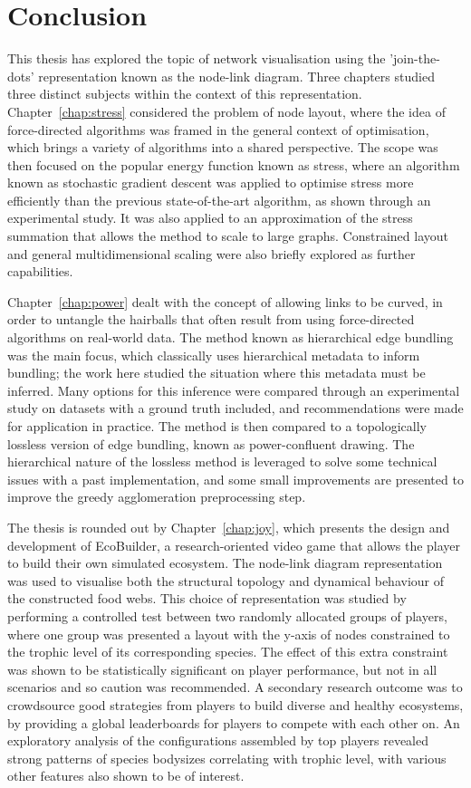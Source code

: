 \chapter{Conclusion}
\label{chap:conclusion}

This thesis has explored the topic of network visualisation using the 'join-the-dots' representation known as the node-link diagram.
Three chapters studied three distinct subjects within the context of this representation.
Chapter~\ref{chap:stress} considered the problem of node layout, where the idea of force-directed algorithms was framed in the general context of optimisation, which brings a variety of algorithms into a shared perspective.
The scope was then focused on the popular energy function known as stress, where an algorithm known as stochastic gradient descent was applied to optimise stress more efficiently than the previous state-of-the-art algorithm, as shown through an experimental study.
It was also applied to an approximation of the stress summation that allows the method to scale to large graphs.
Constrained layout and general multidimensional scaling were also briefly explored as further capabilities.

Chapter~\ref{chap:power} dealt with the concept of allowing links to be curved, in order to untangle the hairballs that often result from using force-directed algorithms on real-world data. The method known as hierarchical edge bundling was the main focus, which classically uses hierarchical metadata to inform bundling; the work here studied the situation where this metadata must be inferred. Many options for this inference were compared through an experimental study on datasets with a ground truth included, and recommendations were made for application in practice.
The method is then compared to a topologically lossless version of edge bundling, known as power-confluent drawing. The hierarchical nature of the lossless method is leveraged to solve some technical issues with a past implementation, and some small improvements are presented to improve the greedy agglomeration preprocessing step.

The thesis is rounded out by Chapter~\ref{chap:joy}, which presents the design and development of EcoBuilder, a research-oriented video game that allows the player to build their own simulated ecosystem.
The node-link diagram representation was used to visualise both the structural topology and dynamical behaviour of the constructed food webs. This choice of representation was studied by performing a controlled test between two randomly allocated groups of players, where one group was presented a layout with the y-axis of nodes constrained to the trophic level of its corresponding species. The effect of this extra constraint was shown to be statistically significant on player performance, but not in all scenarios and so caution was recommended.
A secondary research outcome was to crowdsource good strategies from players to build diverse and healthy ecosystems, by providing a global leaderboards for players to compete with each other on. An exploratory analysis of the configurations assembled by top players revealed strong patterns of species bodysizes correlating with trophic level, with various other features also shown to be of interest.


